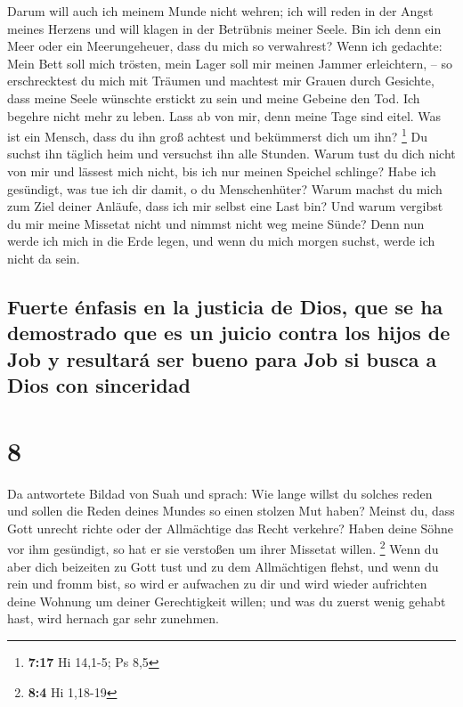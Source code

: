  Darum will auch ich meinem Munde nicht wehren; ich will
reden in der Angst meines Herzens und will klagen in der Betrübnis
meiner Seele.  Bin ich denn ein Meer oder ein
Meerungeheuer, dass du mich so verwahrest?  Wenn ich
gedachte: Mein Bett soll mich trösten, mein Lager soll mir meinen Jammer
erleichtern, --  so erschrecktest du mich mit Träumen und
machtest mir Grauen durch Gesichte,  dass meine Seele
wünschte erstickt zu sein und meine Gebeine den Tod.  Ich
begehre nicht mehr zu leben. Lass ab von mir, denn meine Tage sind
eitel.  Was ist ein Mensch, dass du ihn groß achtest und
bekümmerst dich um ihn? \footnote{\textbf{7:17} Hi 14,1-5; Ps 8,5}
 Du suchst ihn täglich heim und versuchst ihn alle
Stunden.  Warum tust du dich nicht von mir und lässest
mich nicht, bis ich nur meinen Speichel schlinge?  Habe
ich gesündigt, was tue ich dir damit, o du Menschenhüter? Warum machst
du mich zum Ziel deiner Anläufe, dass ich mir selbst eine Last bin?
 Und warum vergibst du mir meine Missetat nicht und
nimmst nicht weg meine Sünde? Denn nun werde ich mich in die Erde legen,
und wenn du mich morgen suchst, werde ich nicht da sein.

\hypertarget{fuerte-uxe9nfasis-en-la-justicia-de-dios-que-se-ha-demostrado-que-es-un-juicio-contra-los-hijos-de-job-y-resultaruxe1-ser-bueno-para-job-si-busca-a-dios-con-sinceridad}{%
\subsection{Fuerte énfasis en la justicia de Dios, que se ha demostrado
que es un juicio contra los hijos de Job y resultará ser bueno para Job
si busca a Dios con
sinceridad}\label{fuerte-uxe9nfasis-en-la-justicia-de-dios-que-se-ha-demostrado-que-es-un-juicio-contra-los-hijos-de-job-y-resultaruxe1-ser-bueno-para-job-si-busca-a-dios-con-sinceridad}}

\hypertarget{section-7}{%
\section{8}\label{section-7}}

 Da antwortete Bildad von Suah und sprach: 
Wie lange willst du solches reden und sollen die Reden deines Mundes so
einen stolzen Mut haben?  Meinst du, dass Gott unrecht
richte oder der Allmächtige das Recht verkehre?  Haben
deine Söhne vor ihm gesündigt, so hat er sie verstoßen um ihrer Missetat
willen. \footnote{\textbf{8:4} Hi 1,18-19}  Wenn du aber
dich beizeiten zu Gott tust und zu dem Allmächtigen flehst,
 und wenn du rein und fromm bist, so wird er aufwachen zu
dir und wird wieder aufrichten deine Wohnung um deiner Gerechtigkeit
willen;  und was du zuerst wenig gehabt hast, wird hernach
gar sehr zunehmen.

